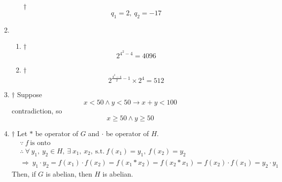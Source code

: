 \documentclass[a4paper,12pt]{article}
\begin{document}
\begin{enumerate}
\begin{enumerate}[label=(\alph*)]
\begin{answer}{$\dag$}
\begin{equation}
                q_1 = 2, \ q_2 = -17
            \end{equation}
        \end{answer}
    \end{enumerate}
    \item \begin{enumerate}[label=(\alph*)]
        \item \begin{answer}{$\dag$}\begin{equation}
                2^{4^2 - 4} = 4096
            \end{equation}
        \end{answer}
        \item \begin{answer}{$\dag$}\begin{equation}
                2^{\frac{4^2 - 4}{2} - 1} \times 2^4 = 512
            \end{equation}
        \end{answer}
    \end{enumerate}
    \item \begin{answer}{$\dag$} Suppose \begin{equation}
            x < 50 \land y < 50 \rightarrow x + y < 100
        \end{equation} contradiction, so \begin{equation}
            x \ge 50 \land y \ge 50
        \end{equation}
    \end{answer}
    \item \begin{answer}{$\dag$} Let $*$ be operator of $G$ and $\cdot$ be operator of $H$. \begin{equation}
            \begin{aligned}
                & \because \ f \ \text{is onto} \\
                & \therefore \ \forall \ y_1, \ y_2 \in H, \ \exists \ x_1, \ x_2, \ \text{s.t.} \ f(x_1) = y_1, \ f(x_2) = y_2 \\
                & \Rightarrow \ y_1 \cdot y_2 = f(x_1) \cdot f(x_2) = f(x_1 * x_2) = f(x_2 * x_1) = f(x_2) \cdot f(x_1) = y_2 \cdot y_1
            \end{aligned}
        \end{equation} Then, if $G$ is abelian, then $H$ is abelian.
    \end{answer}
\end{enumerate}

\end{document}
